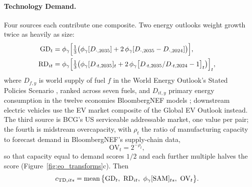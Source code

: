\paragraph{Technology Demand.}\label{subsec:eo_demand} Four sources each contribute one composite.
Two energy outlooks weight growth twice as heavily as size:
\begin{align}
  \mathrm{GD}_{t}&=\phi_{\gamma}\Big[\tfrac13\big(\phi_{\gamma}[D_{\cdot,2035}]+2\,\phi_{\gamma}[D_{\cdot,2035}-D_{\cdot,2024}]\big)\Big],
  \label{eq:eo_weo}\\
  \mathrm{RD}_{it}&=\phi_{\gamma}\Big[\tfrac13\big(\phi_{\gamma}[D_{\cdot t,2035}]_t
  +2\,\phi_{\gamma}\big[D_{\cdot t,2035}/D_{\cdot t,2024}-1\big]_t\big)\Big]_t ,
  \label{eq:eo_bnef}
\end{align}
where $D_{f,y}$ is world supply of fuel $f$ in the World Energy Outlook's Stated Policies Scenario
\citep{iea2025weo}, ranked across seven fuels, and $D_{it,y}$ primary energy consumption in the
twelve economies BloombergNEF models \citep{bnef2024neo}; downstream electric vehicles use the EV
market composite of the Global EV Outlook \citep{iea2026gevo} instead. The third source is BCG's
US serviceable addressable market, one value per pair; the fourth is midstream overcapacity, with
$\rho_t$ the ratio of manufacturing capacity to forecast demand in BloombergNEF's supply-chain data,
\begin{equation}\label{eq:eo_overcap}
  \mathrm{OV}_t=2^{-\rho_t},
\end{equation}
so that capacity equal to demand scores $1/2$ and each further multiple halves the score
(Figure~\ref{fig:eo_transforms}c). Then
\begin{equation}\label{eq:eo_demand}
  c_{\mathrm{TD},its}=\operatorname{mean}\big\{\mathrm{GD}_t,\ \mathrm{RD}_{it},\
  \phi_{\gamma}[\mathrm{SAM}]_{ts},\ \mathrm{OV}_t\big\}.
\end{equation}

